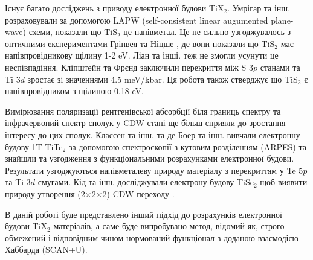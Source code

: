 Існує багато досліджень з приводу електронної будови TiX$_2$. Умрігар та інш. \cite{Benesh_1985} розраховували за допомогою LAPW (self-consistent linear augumented plane-wave) схеми, показали що TiS$_2$ це напівметал. Це не сильно узгоджувалось з оптичними експериментами Грінвея та Ніцше \cite{GREENAWAY19651445}, де вони показали що TiS$_2$ має напівпровідникову щілину 1-2 eV. Ліан та інші. \cite{Beal_1972} теж не змогли усунути це неспівпадіння. Кліпштейн та Фрєнд заключили \cite{Klipstein_1984} перекриття між S $3p$ станами та Ti $3d$ зростає зі значеннями 4.5 meV/kbar. Ця робота також стверджує що TiS$_2$ є напівпровідником з щілиною 0.18 eV. 

Вимірювання поляризації рентгенівської абсорбції біля границь спектру \cite{PhysRevB.58.7668,PhysRevB.56.3212, PhysRevB.8.3576} та інфрачервоний спектр сполук у CDW стані \cite{PhysRevB.29.2060} ще більш сприяли до зростання інтересу до цих сполук. Классен та інш. \cite{PhysRevB.54.2453} та де Боер та інш. \cite{PhysRevB.29.6797} вивчали електронну будову 1T-TiTe$_2$  за допомогою спектроскопії з кутовим розділенням (ARPES) та знайшли та узгодження з функціональними розрахунками електронної будови. Результати узгоджуються напівметалеву природу матеріалу з перекриттям у Te 5$p$ та Ti $3d$ смугами. Кід та інш. досліджували електрону будову TiSe$_2$ щоб виявити природу утворення (2$\times$2$\times$2) CDW переходу \cite{PhysRevLett.88.226402}.

В даній роботі буде представлено інший підхід до розрахунків електронної будови TiX$_2$ матеріалів, а саме буде випробувано метод, відомий як, строго обмежений і відповідним чином нормований функціонал з доданою взаємодією Хаббарда (SCAN+U). 

